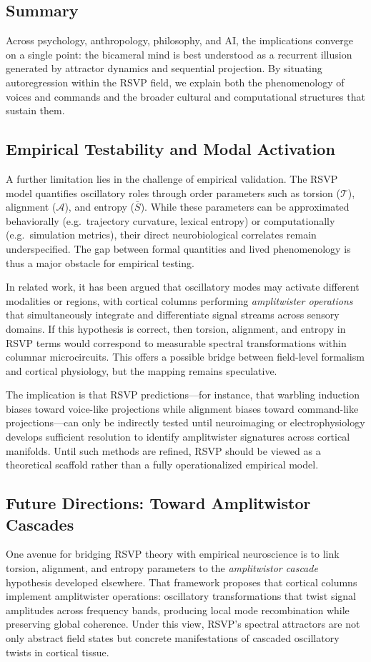 \documentclass[a4paper,11pt]{article}
\begin{document}
\subsection{Summary}
Across psychology, anthropology, philosophy, and AI, the implications converge
on a single point: the bicameral mind is best understood as a recurrent illusion
generated by attractor dynamics and sequential projection. By situating
autoregression within the RSVP field, we explain both the phenomenology of
voices and commands and the broader cultural and computational structures that
sustain them.

\subsection{Empirical Testability and Modal Activation}
A further limitation lies in the challenge of empirical validation. The RSVP
model quantifies oscillatory roles through order parameters such as torsion
($\mathcal{T}$), alignment ($\mathcal{A}$), and entropy ($\bar{S}$). While
these parameters can be approximated behaviorally (e.g.\ trajectory curvature,
lexical entropy) or computationally (e.g.\ simulation metrics), their direct
neurobiological correlates remain underspecified. The gap between formal
quantities and lived phenomenology is thus a major obstacle for empirical
testing.

In related work, it has been argued that oscillatory modes may activate
different modalities or regions, with cortical columns performing
\emph{amplitwister operations} that simultaneously integrate and differentiate
signal streams across sensory domains. If this hypothesis is correct, then
torsion, alignment, and entropy in RSVP terms would correspond to measurable
spectral transformations within columnar microcircuits. This offers a possible
bridge between field-level formalism and cortical physiology, but the mapping
remains speculative.

The implication is that RSVP predictions---for instance, that warbling induction
biases toward voice-like projections while alignment biases toward
command-like projections---can only be indirectly tested until neuroimaging or
electrophysiology develops sufficient resolution to identify amplitwister
signatures across cortical manifolds. Until such methods are refined, RSVP
should be viewed as a theoretical scaffold rather than a fully operationalized
empirical model.

\subsection{Future Directions: Toward Amplitwistor Cascades}
One avenue for bridging RSVP theory with empirical neuroscience is to link
torsion, alignment, and entropy parameters to the \emph{amplitwistor cascade}
hypothesis developed elsewhere. That framework proposes that cortical columns
implement amplitwister operations: oscillatory transformations that twist signal
amplitudes across frequency bands, producing local mode recombination while
preserving global coherence. Under this view, RSVP’s spectral attractors are not
only abstract field states but concrete manifestations of cascaded oscillatory
twists in cortical tissue.
\end{document}
